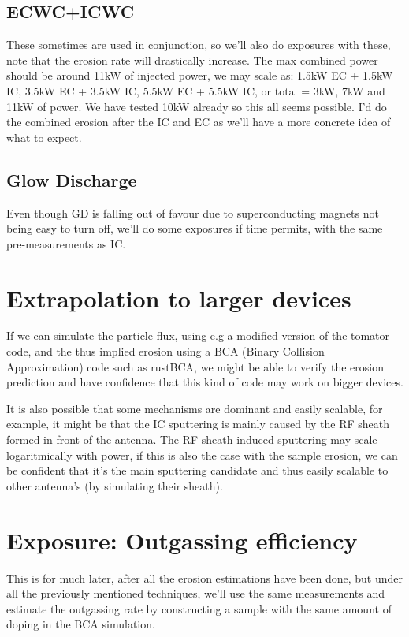 \documentclass{article}
\begin{document}
\subsection{ECWC+ICWC}
These sometimes are used in conjunction, so we'll also do exposures with these,
note that the erosion rate will drastically increase. The max combined power
should be around 11kW of injected power, we may scale as: 1.5kW EC + 1.5kW IC,
3.5kW EC + 3.5kW IC, 5.5kW EC + 5.5kW IC, or total = 3kW, 7kW and 11kW of
power. We have tested 10kW already so this all seems possible.  I'd do the
combined erosion after the IC and EC as we'll have a more concrete idea of what
to expect.
\subsection{Glow Discharge}
Even though GD is falling out of favour due to superconducting magnets not
being easy to turn off, we'll do some exposures if time permits, with the same
pre-measurements as IC.
\section{Extrapolation to larger devices}
If we can simulate the particle flux, using e.g a modified version of the
tomator code, and the thus implied erosion using a BCA (Binary Collision
Approximation) code such as rustBCA, we might be able to verify the erosion
prediction and have confidence that this kind of code may work on
bigger devices.

It is also possible that some mechanisms are dominant and easily scalable, for
example, it might be that the IC sputtering is mainly caused by the RF sheath
formed in front of the antenna.  The RF sheath induced sputtering may scale
logaritmically with power, if this is also the case with the sample erosion, we
can be confident that it's the main sputtering candidate and thus easily
scalable to other antenna's (by simulating their sheath).

\section{Exposure: Outgassing efficiency}
This is for much later, after all the erosion estimations have been done, but
under all the previously mentioned techniques, we'll use the same measurements
and estimate the outgassing rate by constructing a sample with the same amount
of doping in the BCA simulation.



\end{document}
